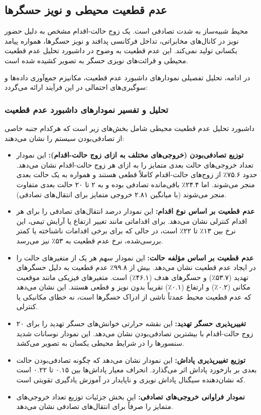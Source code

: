 \documentclass[oneside,openany,a4paper,12pt]{article}
\begin{document}
\subsection{عدم قطعیت محیطی و نویز حسگرها}
محیط شبیه‌ساز به شدت تصادفی  است. یک زوج حالت-اقدام مشخص به دلیل حضور نویز در کانال‌های مخابراتی، تداخل فرکانسی پدافند و نویز حسگرها، همواره پیامد یکسانی تولید نمی‌کند. این عدم قطعیت به وضوح در داشبورد تحلیل عدم قطعیت محیطی و قرائت‌های نویزی حسگر به تصویر کشیده شده است.

در ادامه، تحلیل تفصیلی نمودارهای داشبورد عدم قطعیت، مکانیزم جمع‌آوری داده‌ها و سوگیری‌های احتمالی در این فرآیند ارائه می‌گردد:

\subsubsection{تحلیل و تفسیر نمودارهای داشبورد عدم قطعیت}
داشبورد تحلیل عدم قطعیت محیطی شامل بخش‌های زیر است که هرکدام جنبه خاصی از تصادفی‌بودن سیستم را نشان می‌دهند:
\begin{itemize}
    \item \textbf{توزیع تصادفی‌بودن (خروجی‌های مختلف به ازای زوج حالت-اقدام):} این نمودار تعداد خروجی‌های حالت بعدی متمایز را به ازای هر زوج حالت-اقدام نشان می‌دهد. حدود ۷۵.۶٪ از زوج‌های حالت-اقدام کاملاً قطعی هستند و همواره به یک حالت بعدی منجر می‌شوند. اما ۲۴.۴٪ باقی‌مانده تصادفی بوده و به ۲ تا ۲۰ حالت بعدی متفاوت منجر می‌شوند (با میانگین ۲.۸۱ خروجی متمایز برای انتقال‌های تصادفی).
    \item \textbf{عدم قطعیت بر اساس نوع اقدام:} این نمودار درصد انتقال‌های تصادفی را برای هر اقدام کنترلی نشان می‌دهد. برای اقداماتی مانند تغییر ارتفاع یا آرایش تیمی، این نرخ بین ۱۳٪ تا ۲۲٪ است، در حالی که برای برخی اقدامات ناشناخته یا کمتر بررسی‌شده، نرخ عدم قطعیت به ۵۳٪ نیز می‌رسد.
    \item \textbf{عدم قطعیت بر اساس مؤلفه حالت:} این نمودار سهم هر یک از متغیرهای حالت را در ایجاد عدم قطعیت نشان می‌دهد. بیش از ۹۹.۸٪ عدم قطعیت به دلیل حسگرهای تهدید (۵۳.۷٪) و حسگرهای هدف (۴۶.۱٪) است. متغیرهای فیزیکی مانند موقعیت مکانی (۰.۲٪) و ارتفاع (۰.۱٪) تقریباً بدون نویز و قطعی هستند. این نشان می‌دهد که عدم قطعیت محیط عمدتاً ناشی از ادراک حسگرها است، نه خطای مکانیکی یا کنترلی.
    \item \textbf{تغییرپذیری حسگر تهدید:} این نقشه حرارتی خوانش‌های حسگر تهدید را برای ۲۰ زوج حالت-اقدام با بیشترین تصادفی‌بودن نشان می‌دهد. این نمودار نوسانات شدید سنسورها را در شرایط محیطی یکسان به تصویر می‌کشد.
    \item \textbf{توزیع تغییرپذیری پاداش:} این نمودار نشان می‌دهد که چگونه تصادفی‌بودن حالت بعدی بر بازخورد پاداش اثر می‌گذارد. انحراف معیار پاداش‌ها بین ۰.۱۵ تا ۰.۲۲ است که نشان‌دهنده سیگنال پاداش نویزی و ناپایدار در آموزش یادگیری تقویتی است.
    \item \textbf{نمودار فراوانی خروجی‌های تصادفی:} این بخش جزئیات توزیع تعداد خروجی‌های متمایز را صرفاً برای انتقال‌های تصادفی نشان می‌دهد.
\end{itemize}
\end{document}
